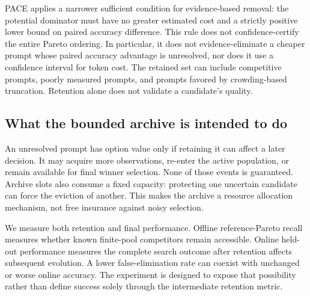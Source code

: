 PACE applies a narrower sufficient condition for evidence-based removal: the
potential dominator must have no greater estimated cost and a strictly positive
lower bound on paired accuracy difference. This rule does not confidence-certify
the entire Pareto ordering. In particular, it does not evidence-eliminate a
cheaper prompt whose paired accuracy advantage is unresolved, nor does it use a
confidence interval for token cost. The retained set can include competitive prompts, poorly measured prompts,
and prompts favored by crowding-based truncation. Retention alone does not
validate a candidate's quality.

\subsection{What the bounded archive is intended to do}
An unresolved prompt has option value only if retaining it can affect a later
decision. It may acquire more observations, re-enter the active population, or
remain available for final winner selection. None of those events is guaranteed.
Archive slots also consume a fixed capacity: protecting one uncertain candidate
can force the eviction of another. This makes the archive a resource allocation
mechanism, not free insurance against noisy selection.

We measure both retention and final performance. Offline reference-Pareto recall measures
whether known finite-pool competitors remain accessible. Online held-out
performance measures the complete search outcome after retention affects
subsequent evolution. A lower false-elimination rate can coexist with unchanged
or worse online accuracy. The experiment is designed to expose that possibility
rather than define success solely through the intermediate retention metric.
